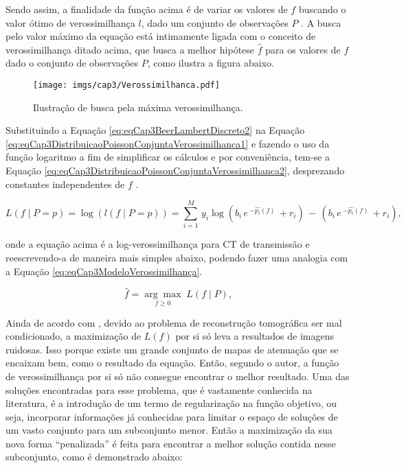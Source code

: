{{Sendo assim, a finalidade da função acima é de variar os valores de $f$ buscando o valor ótimo de verossimilhança $l$, dado um conjunto de observações $P$ \cite[p. 231]{buzug2008computed}. A busca pelo valor máximo da equação está intimamente ligada com o conceito de verossimilhança ditado acima, que busca a melhor hipótese $\hat{f}$ para os valores de $f$ dado o conjunto de observações $P$, como ilustra a figura abaixo. 


\begin{figure}[H]
	\caption{Ilustração de busca pela máxima verossimilhança.}
	\begin{center}
		\texttt{[image: imgs/cap3/Verossimilhanca.pdf]}
	\end{center}
	\label{fig:imgCap3Verossimilhanca}
\end{figure}   

Substituindo a Equação \ref{eq:eqCap3BeerLambertDiscreto2} na Equação \ref{eq:eqCap3DistribuicaoPoissonConjuntaVerossimilhanca1} e fazendo o uso da função logaritmo a fim de simplificar os cálculos e por conveniência, tem-se a Equação \ref{eq:eqCap3DistribuicaoPoissonConjuntaVerossimilhanca2}, desprezando constantes independentes de $f$ \cite[p. 10]{Fessler2000handbook}. 

\begin{equation}
L(f \mid P = p) = \log (l(f \mid P = p)) = \sum_{i=1}^{M} \, y_{i} \log (b_{i} \, e \, ^{-\hat{p_{i}}(f)} \, + r_{i}) \,-\,(b_{i} \, e \, ^{-\hat{p_{i}}(f)} \, + r_{i}),
\label{eq:eqCap3DistribuicaoPoissonConjuntaVerossimilhanca2}
\end{equation} 

\noindent onde a equação acima é a log-verossimilhança para \acs{CT} de transmissão e reescrevendo-a de maneira mais simples abaixo, podendo fazer uma analogia com a Equação \ref{eq:eqCap3ModeloVerossimilhança}.

\begin{equation}
\hat{f} = \underset{f\geq 0}{\arg\max} \; L(f \mid P),
\label{eq:eqCap3VerossimilhançaFinal}
\end{equation}

Ainda de acordo com , devido ao problema de reconstrução tomográfica ser mal condicionado, a maximização de $L(f)$ por si só leva a resultados de imagens ruidosas. Isso porque existe um grande conjunto de mapas de atenuação que se encaixam bem, como o resultado da equação. Então, segundo o autor, a função de verossimilhança por si só não consegue encontrar o melhor resultado. Uma das soluções encontradas para esse problema, que é vastamente conhecida na literatura, é a introdução de um termo de regularização na função objetivo, ou seja, incorporar informações já conhecidas para limitar o espaço de soluções de um vasto conjunto para um subconjunto menor. Então a maximização da sua nova forma ``penalizada'' é feita para encontrar a melhor solução contida nesse subconjunto, como é demonstrado abaixo:     

}}
